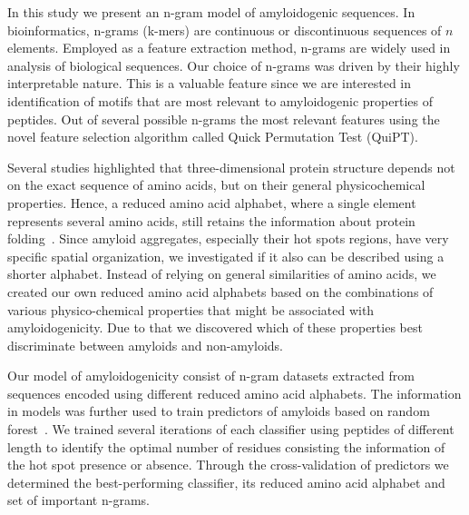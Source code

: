 \documentclass{bioinfo}
\begin{document}
  In this study we present an n-gram model of amyloidogenic sequences. In 
bioinformatics, n-grams (k-mers) are continuous or discontinuous sequences of $n$ 
elements. Employed as a feature extraction method, n-grams are widely used in 
analysis of biological sequences. Our choice of n-grams was driven by their 
highly interpretable nature. This is a valuable feature since we are interested in identification of 
motifs that are most relevant to amyloidogenic properties of peptides. Out of several possible n-grams 
the most relevant features using the novel feature selection algorithm called Quick Permutation Test 
(QuiPT).

  Several studies highlighted that three-dimensional protein structure depends 
not on the exact sequence of amino acids, but on their general physicochemical 
properties. Hence, a reduced amino acid alphabet, where a single element 
represents several amino acids, still retains the information about protein 
folding~\citep{murphy_simplified_2000}. Since amyloid aggregates, especially 
their hot spots regions, have very specific spatial organization, we 
investigated if it also can be described using a shorter alphabet. Instead of 
relying on general similarities of amino acids, we created our own reduced amino 
acid alphabets based on the combinations of various physico-chemical properties that might be associated with amyloidogenicity. Due to that we discovered which of these
properties best discriminate between amyloids and non-amyloids.

  Our model of amyloidogenicity consist of n-gram datasets extracted from 
sequences encoded using different reduced amino acid alphabets. The information 
in models was further used to train predictors of amyloids based on random 
forest~\citep{breiman_random_2001}. We trained several iterations of each 
classifier using peptides of different length to identify the optimal number of 
residues consisting the information of the hot spot presence or absence. 
Through the cross-validation of predictors we determined the best-performing 
classifier, its reduced amino acid alphabet and set of important n-grams.
\end{document}
